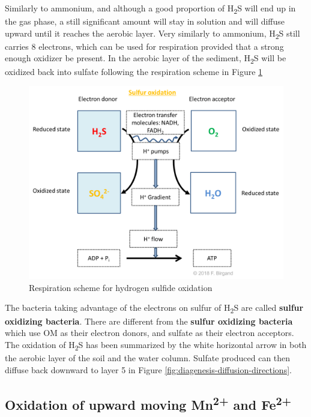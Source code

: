 \documentclass[]{book}
\theoremstyle{definition}
\theoremstyle{definition}
\theoremstyle{definition}
\theoremstyle{remark}
\begin{document}
Similarly to ammonium, and although a good proportion of
H\textsubscript{2}S will end up in the gas phase, a still significant
amount will stay in solution and will diffuse upward until it reaches
the aerobic layer. Very similarly to ammonium, H\textsubscript{2}S still
carries 8 electrons, which can be used for respiration provided that a
strong enough oxidizer be present. In the aerobic layer of the sediment,
H\textsubscript{2}S will be oxidized back into sulfate following the
respiration scheme in Figure \ref{fig:respiration-H2S-O2}

\begin{figure}

{\centering \includegraphics[width=0.75\linewidth]{pictures/respiration-H2S-O2} 

}

\caption{Respiration scheme for hydrogen sulfide oxidation}\label{fig:respiration-H2S-O2}
\end{figure}

The bacteria taking advantage of the electrons on sulfur of
H\textsubscript{2}S are called \textbf{sulfur oxidizing bacteria}. There
are different from the \textbf{sulfur oxidizing bacteria} which use OM
as their electron donors, and sulfate as their electron acceptors. The
oxidation of H\textsubscript{2}S has been summarized by the white
horizontal arrow in both the aerobic layer of the soil and the water
column. Sulfate produced can then diffuse back downward to layer 5 in
Figure \ref{fig:diagenesis-diffusion-directions}.

\subsection{\texorpdfstring{Oxidation of upward moving
Mn\textsuperscript{2+} and
Fe\textsuperscript{2+}}{Oxidation of upward moving Mn2+ and Fe2+}}\label{oxidation-of-upward-moving-mn2-and-fe2}
\end{document}
